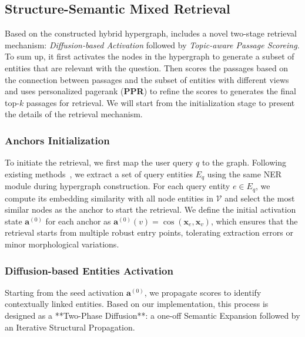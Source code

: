 \subsection{Structure-Semantic Mixed Retrieval}
\label{sec:retrieval}
Based on the constructed hybrid hypergraph, \EHGRAG includes a novel two-stage retrieval mechanism: \textit{Diffusion-based Activation} followed by \textit{Topic-aware Passage Scoreing}. To sum up, it first activates the nodes in the hypergraph to generate a subset of entities that are relevant with the question. Then \EHGRAG scores the passages based on the connection between passages and the subset of entities with different views and uses personalized pagerank (\textbf{PPR}) to refine the scores to generates the final top-$k$ passages for retrieval. We will start from the initialization stage to present the details of the retrieval mechanism.

\subsubsection{Anchors Initialization}
To initiate the retrieval, we first map the user query $q$ to the graph. Following existing methods~\cite{zhuang2025linearrag,edge2024local,zhao20252graphrag}, we extract a set of query entities $E_q$ using the same NER module during hypergraph construction. For each query entity $e \in E_q$, we compute its embedding similarity with all node entities in $\mathcal{V}$ and select the most similar nodes as the anchor to start the retrieval.
We define the initial activation state $\mathbf{a}^{(0)}$ for each anchor as $\mathbf{a}^{(0)}(v) = \cos(\mathbf{x}_e, \mathbf{x}_v)$, which ensures that the retrieval starts from multiple robust entry points, tolerating extraction errors or minor morphological variations.

\subsubsection{Diffusion-based Entities Activation}
Starting from the seed activation $\mathbf{a}^{(0)}$, we propagate scores to identify contextually linked entities. Based on our implementation, this process is designed as a **Two-Phase Diffusion**: a one-off Semantic Expansion followed by an Iterative Structural Propagation.

